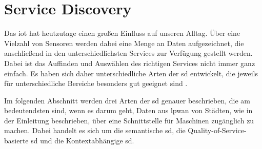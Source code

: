 \section{Service Discovery}\label{sec:sd}

Das \gls{iot} hat heutzutage einen großen Einfluss auf unseren Alltag.
Über eine Vielzahl von Sensoren werden dabei eine Menge an Daten aufgezeichnet, die anschließend in den unterschiedlichsten Services zur Verfügung gestellt werden.
Dabei ist das Auffinden und Auswählen des richtigen Services nicht immer ganz einfach.
Es haben sich daher unterschiedliche Arten der \gls{sd} entwickelt, die jeweils für unterschiedliche Bereiche besonders gut geeignet sind \autocite{Achir.2020.AtosdaiI}.

Im folgenden Abschnitt werden drei Arten der \gls{sd} genauer beschrieben, die am bedeutendsten sind, wenn es darum geht, Daten aus \gls{lpwan} von Städten, wie in der Einleitung beschrieben, über eine Schnittstelle für Maschinen zugänglich zu machen.
Dabei handelt es sich um die semantische \gls{sd}, die Quality-of-Service-basierte \gls{sd} und die Kontextabhängige \gls{sd}.




